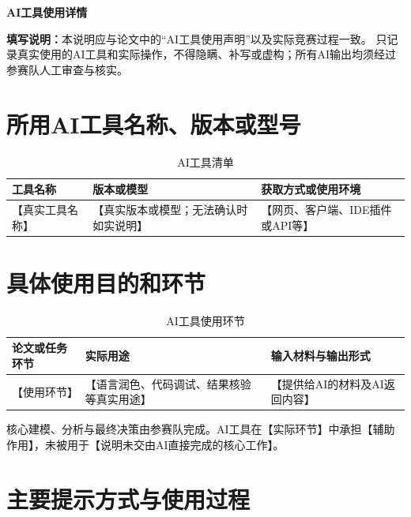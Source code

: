 \documentclass[fontset=mac, 12pt, a4paper]{ctexart}
\begin{document}
\begin{center}
  {\fontsize{17.3pt}{22pt}\heiti\bfseries AI工具使用详情}
\end{center}

\noindent\textbf{填写说明：}本说明应与论文中的“AI工具使用声明”以及实际竞赛过程一致。
只记录真实使用的AI工具和实际操作，不得隐瞒、补写或虚构；所有AI输出均须经过参赛队人工审查与核实。

\section{所用AI工具名称、版本或型号}

\begin{table}[htbp]
  \centering
  \caption{AI工具清单}
  \begin{tabular}{p{}p{}p{}}
    \toprule
    \textbf{工具名称} & \textbf{版本或模型} & \textbf{获取方式或使用环境} \\
    \midrule
    【真实工具名称】 & 【真实版本或模型；无法确认时如实说明】 & 【网页、客户端、IDE插件或API等】 \\
    \bottomrule
  \end{tabular}
  \label{tab:ai-tools}
\end{table}

\section{具体使用目的和环节}

\begin{table}[htbp]
  \centering
  \caption{AI工具使用环节}
  \begin{tabular}{p{}p{}p{}}
    \toprule
    \textbf{论文或任务环节} & \textbf{实际用途} & \textbf{输入材料与输出形式} \\
    \midrule
    【使用环节】 & 【语言润色、代码调试、结果核验等真实用途】 & 【提供给AI的材料及AI返回内容】 \\
    \bottomrule
  \end{tabular}
  \label{tab:ai-stages}
\end{table}

核心建模、分析与最终决策由参赛队完成。AI工具在【实际环节】中承担【辅助作用】，未被用于【说明未交由AI直接完成的核心工作】。

\section{主要提示方式与使用过程}
\end{document}
